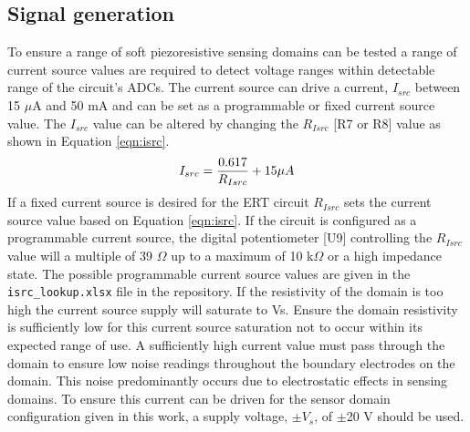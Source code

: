 \subsection{Signal generation}
To ensure a range of soft piezoresistive sensing domains can be tested a range of current source values are required to detect voltage ranges within detectable range of the circuit's ADCs. The current source can drive a current, $I_{src}$ between 15 $\mu$A and 50 mA and can be set as a programmable or fixed current source value. The $I_{src}$ value can be altered by changing the $R_{Isrc}$ [R7 or R8] value as shown in Equation \ref{eqn:isrc}.
\begin{equation}
I_{src} = \frac{0.617}{R_{Isrc}} + 15 \space \mu A
\label{eqn:isrc}
\end{equation}
If a fixed current source is desired for the ERT circuit $R_{Isrc}$ sets the current source value based on Equation \ref{eqn:isrc}. If the circuit is configured as a programmable current source, the digital potentiometer [U9] controlling the $R_{Isrc}$ value will a multiple of 39 $\Omega$ up to a maximum of 10 k$\Omega$ or a high impedance state. The possible programmable current source values are given in the \verb|isrc_lookup.xlsx| file in the repository. If the resistivity of the domain is too high the current source supply will saturate to Vs. Ensure the domain resistivity is sufficiently low for this current source saturation not to occur within its expected range of use. 
A sufficiently high current value must pass through the domain to ensure low noise readings throughout the boundary electrodes on the domain. This noise predominantly occurs due to electrostatic effects in sensing domains. To ensure this current can be driven for the sensor domain configuration given in this work, a supply voltage, $\pm V_s$, of $\pm$20 V should be used.


